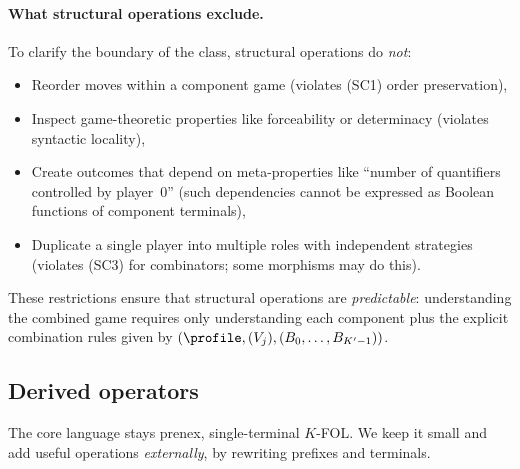 
\paragraph{What structural operations exclude.}
To clarify the boundary of the class, structural operations do \emph{not}:
\begin{itemize}[nosep]
  \item Reorder moves within a component game (violates (SC1) order preservation),
  \item Inspect game-theoretic properties like forceability or determinacy 
    (violates syntactic locality),
  \item Create outcomes that depend on meta-properties like ``number of quantifiers 
    controlled by player~0'' (such dependencies cannot be expressed as Boolean 
    functions of component terminals),
  \item Duplicate a single player into multiple roles with independent strategies 
    (violates (SC3) for combinators; some morphisms may do this).
\end{itemize}
These restrictions ensure that structural operations are \emph{predictable}: 
understanding the combined game requires only understanding each component plus 
the explicit combination rules given by $(\profile, (V_j), (B_0,\ldots,B_{K'-1}))$.

\subsection{Derived operators}
\label{sec:derived-ops}
The core language stays prenex, single-terminal $K$-FOL. We keep it
small and add useful operations \emph{externally}, by rewriting
prefixes and terminals.

